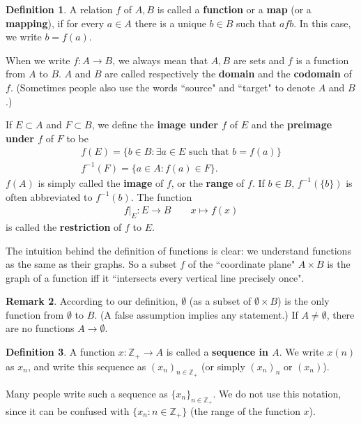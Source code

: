 \documentclass[12pt,b5paper,notitlepage]{article}
\theoremstyle{definition}
\newtheorem{df}{Definition}[section]
\newtheorem{rem}[df]{Remark}
\theoremstyle{plain}
\newcommand{\Zbb}{\mathbb Z}
\numberwithin{equation}{section}
\begin{document}
\begin{df}\label{lb39}
A relation $f$ of $A,B$  is called a \textbf{function} or a \textbf{map} (or a \textbf{mapping}), if for every $a\in A$ there is a unique $b\in B$ such that $afb$. In this case, we write $b=f(a)$. 

When we write $f:A\rightarrow B$, we always mean that $A,B$ are sets and $f$ is a function from $A$ to $B$. $A$ and $B$ are called respectively the \textbf{domain} and the \textbf{codomain} of $f$. (Sometimes people also use the words ``source" and ``target" to denote $A$ and $B$.) 

If $E\subset A$ and $F\subset B$, we define the \textbf{image under $f$} of $E$  and the \textbf{preimage under $f$} of $F$ to be
\begin{gather*}
f(E)=\{b\in B:\exists a\in E\text{ such that }b=f(a)\}\\
f^{-1}(F)=\{a\in A: f(a)\in F\}.
\end{gather*}
$f(A)$ is simply called the \textbf{image} of $f$, or the \textbf{range} of $f$. If $b\in B$, $f^{-1}(\{b\})$ is often abbreviated to $f^{-1}(b)$. The function 
\begin{align*}
f|_E:E\rightarrow B\qquad x\mapsto f(x)
\end{align*}
is called the \textbf{restriction}  of $f$ to $E$. \hfill\qedsymbol
\end{df}


The intuition behind the definition of functions is clear: we understand functions as the same as their graphs. So a subset $f$ of the ``coordinate plane" $A\times B$ is the graph of a function iff it ``intersects every vertical line precisely once".


\begin{rem}\label{lb40}
According to our definition, $\emptyset$ (as a subset of $\emptyset\times B$) is the only function from $\emptyset$ to $B$. (A false assumption implies any statement.) If $A\neq\emptyset$, there are no functions $A\rightarrow\emptyset$.
\end{rem}


\begin{df}\label{lb13}
A function $x:\Zbb_+\rightarrow A$ is called a \textbf{sequence in $A$}. We write $x(n)$ as $x_n$, and write this sequence as $(x_n)_{n\in\Zbb_+}$ (or simply $(x_n)_n$ or $(x_n)$).
\end{df}

Many people write such a sequence as $\{x_n\}_{n\in\Zbb_+}$. We do not use this notation, since it can be confused with $\{x_n: n\in\Zbb_+\}$ (the range of the function $x$).
\end{document}
